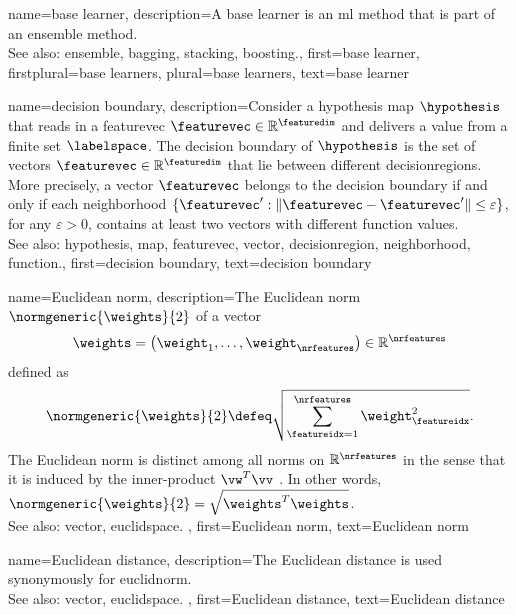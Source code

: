 {name={base learner}, 
 description={A base learner is an \gls{ml} method 
              that is part of an \gls{ensemble} method. \\
		See also: \gls{ensemble}, \gls{bagging}, \gls{stacking}, \gls{boosting}.},
	first={base learner},
	firstplural={base learners},
	plural={base learners},
	text={base learner} 
}	



{name={decision boundary}, 
	description={Consider a 
		\gls{hypothesis} \gls{map} $\hypothesis$ that reads in a \gls{featurevec}  
		$\featurevec \in \mathbb{R}^{\featuredim}$ and delivers a value from a finite set $\labelspace$. 
		The decision boundary of $\hypothesis$ is the set of \glspl{vector} $\featurevec \in \mathbb{R}^{\featuredim}$ 
		that lie between different \glspl{decisionregion}. More precisely, a 
		\gls{vector} $\featurevec$ belongs to the decision boundary if and only 
		if each \gls{neighborhood} $\{ \featurevec': \| \featurevec - \featurevec' \| \leq \varepsilon \}$, 
		for any $\varepsilon >0$, contains at least two \glspl{vector} with different \gls{function} values.
				\\
		See also: \gls{hypothesis}, \gls{map}, \gls{featurevec}, \gls{vector}, \gls{decisionregion}, \gls{neighborhood}, \gls{function}.},
	first={decision boundary},
	text={decision boundary} 
}


{name={Euclidean norm}, 
	description={The 
		Euclidean norm $\normgeneric{\weights}{2}$ of a \gls{vector} 
		$$\weights = \big(\weight_{1},\ldots,\weight_{\nrfeatures} \big) \in
		\mathbb{R}^{\nrfeatures}$$
		defined as 
		$$\normgeneric{\weights}{2} \defeq \sqrt{\sum_{\featureidx=1}^{\nrfeatures}\weight^2_{\featureidx}}.$$ 
		The Euclidean norm is distinct among all norms on $\mathbb{R}^{\nrfeatures}$ in the sense 
		that it is induced by the inner-product $\vw^{T} \vv$ \cite{RudinBook,HalmosFiniteDimVecSpace,BoydConvexBook}. 
		In other words, $\normgeneric{\weights}{2}= \sqrt{\weights^{T} \weights}$.	\\
		See also: \gls{vector}, \gls{euclidspace}. },
	first={Euclidean norm},
	text={Euclidean norm} 
}

{name={Euclidean distance}, 
	description={The Euclidean distance is used 
	synonymously for \gls{euclidnorm}.	\\
	See also: \gls{vector}, \gls{euclidspace}. },
	first={Euclidean distance},
	text={Euclidean distance} 
}

